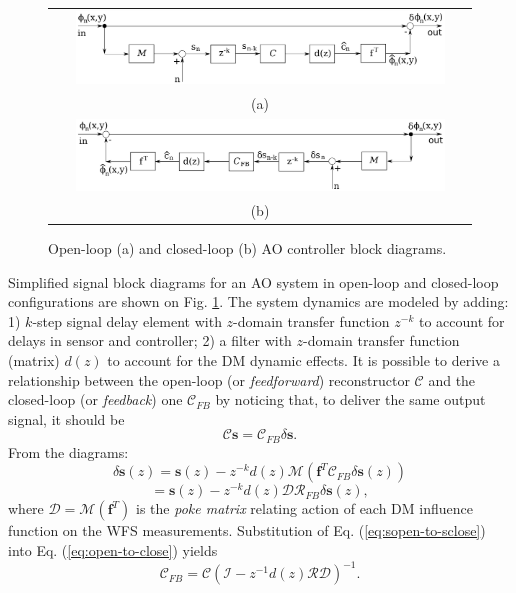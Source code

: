 \begin{figure}[htp]
\begin{center}
\begin{tabular}{c}
 \includegraphics[width = 0.9\textwidth]{Forward.png} \\
 (a) \\
 \includegraphics[width = 0.9\textwidth]{Back.png} \\
 (b) \\
\end{tabular}
\end{center}
\caption{Open-loop (a) and closed-loop (b) AO controller block diagrams.}
\label{fig:forward-back}
\end{figure}

Simplified signal block diagrams for an AO system in open-loop and closed-loop
configurations are shown on Fig. \ref{fig:forward-back}.
The system dynamics are modeled by adding: 1)
$k$-step signal delay element with $z$-domain transfer function $z^{-k}$ to
account for delays in sensor and controller; 2) a filter with $z$-domain
transfer function (matrix) $d(z)$ to account for the DM dynamic
effects. It is possible to derive a relationship between the open-loop (or
\emph{feedforward})
reconstructor $\mathcal{C}$ and the closed-loop (or \emph{feedback}) one
$\mathcal{C}_{FB}$ by noticing that, to deliver the same output signal, it
should be
\begin{equation} \label{eq:open-to-close}
  \mathcal{C} \bm{s} = \mathcal{C}_{FB} \delta \bm{s}.
\end{equation}
From the diagrams:
\begin{equation} \label{eq:sopen-to-sclose}
	\delta \bm{s}(z) = \bm{s}(z) - z^{-k} d(z) \mathcal{M} ( \bm{f}^{T}
	\mathcal{C}_{FB} \delta \bm{s}(z) )
\end{equation}
$$
  = \bm{s}(z) - z^{-k} d(z) \mathcal{DR}_{FB} \delta \bm{s}(z),
$$
where $\mathcal{D} = \mathcal{M} (\bm{f}^{T})$ is the \emph{poke matrix}
relating action of each DM influence function on the WFS measurements.
Substitution of Eq. (\ref{eq:sopen-to-sclose}) into Eq.
(\ref{eq:open-to-close}) yields
\begin{equation} \label{eq:fw-to-fb}
	\mathcal{C}_{FB} = \mathcal{C}
	( \mathcal{I} - z^{-1} d(z) \mathcal{RD} )^{-1}.
\end{equation}

